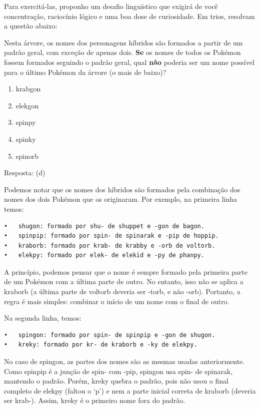\documentclass[
]{book}
\providecommand{\tightlist}{%
  \setlength{\itemsep}{0pt}\setlength{\parskip}{0pt}}
\begin{document}
Para exercitá-las, proponho um desafio linguístico que exigirá de você concentração, raciocínio lógico e uma boa dose de curiosidade. Em trios, resolvam a questão abaixo:

Nesta árvore, os nomes dos personagens híbridos são formados a partir de um padrão geral, com exceção de apenas dois. \textbf{Se} os nomes de todos os Pokémon fossem formados seguindo o padrão geral, qual \textbf{não} poderia ser um nome possível para o último Pokémon da árvore (o mais de baixo)?

\begin{enumerate}
\def\labelenumi{\alph{enumi})}
\tightlist
\item
  krabgon
\item
  elekgon
\item
  spinpy
\item
  spinky
\item
  spinorb
\end{enumerate}

Resposta: (d)

Podemos notar que os nomes dos híbridos são formados pela combinação dos nomes dos dois Pokémon que os originaram. Por exemplo, na primeira linha temos:

\begin{verbatim}
•   shugon: formado por shu- de shuppet e -gon de bagon.
•   spinpip: formado por spin- de spinarak e -pip de hoppip.
•   kraborb: formado por krab- de krabby e -orb de voltorb.
•   elekpy: formado por elek- de elekid e -py de phanpy.
\end{verbatim}

A princípio, podemos pensar que o nome é sempre formado pela primeira parte de um Pokémon com a última parte de outro. No entanto, isso não se aplica a kraborb (a última parte de voltorb deveria ser -torb, e não -orb). Portanto, a regra é mais simples: combinar o início de um nome com o final de outro.

Na segunda linha, temos:

\begin{verbatim}
•   spingon: formado por spin- de spinpip e -gon de shugon.
•   kreky: formado por kr- de kraborb e -ky de elekpy.
\end{verbatim}

No caso de spingon, as partes dos nomes são as mesmas usadas anteriormente. Como spinpip é a junção de spin- com -pip, spingon usa spin- de spinarak, mantendo o padrão. Porém, kreky quebra o padrão, pois não usou o final completo de elekpy (faltou o `p') e nem a parte inicial correta de kraborb (deveria ser krab-). Assim, kreky é o primeiro nome fora do padrão.
\end{document}
